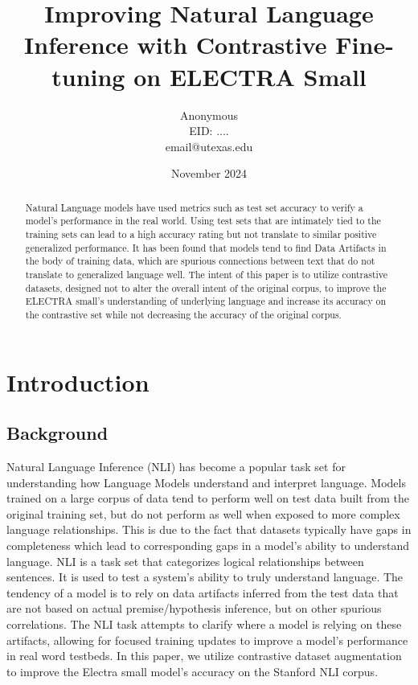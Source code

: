 \documentclass[11pt]{article}
\title{Improving Natural Language Inference with Contrastive Fine-tuning on ELECTRA Small}
\author{Anonymous \\ EID: .... \\ email@utexas.edu}
\date{November 2024}
\begin{document}
\maketitle
\begin{abstract}
Natural Language models have used metrics such as test set accuracy to verify a model's performance in the real world. Using test sets that are intimately tied to the training sets can lead to a high accuracy rating but not translate to similar positive generalized performance. It has been found that models tend to find Data Artifacts in the body of training data, which are spurious connections between text that do not translate to generalized language well. The intent of this paper is to utilize contrastive datasets, designed not to alter the overall intent of the original corpus, to improve the ELECTRA small's understanding of underlying language and increase its accuracy on the contrastive set while not decreasing the accuracy of the original corpus.
\end{abstract}

\section{Introduction}
\subsection{Background}
Natural Language Inference (NLI) has become a popular task set for understanding how Language Models understand and interpret language. Models trained on a large corpus of data tend to perform well on test data built from the original training set, but do not perform as well when exposed to more complex language relationships. This is due to the fact that datasets typically have gaps in completeness which lead to corresponding gaps in a model's ability to understand language. NLI is a task set that categorizes logical relationships between sentences.  It is used to test a system's ability to truly understand language. The tendency of a model is to rely on data artifacts inferred from the test data that are not based on actual premise/hypothesis inference, but on other spurious correlations. The NLI task attempts to clarify where a model is relying on these artifacts, allowing for focused training updates to improve a model's performance in real word testbeds. In this paper, we utilize contrastive dataset augmentation to improve the Electra small model's accuracy on the Stanford NLI corpus.
\end{document}
